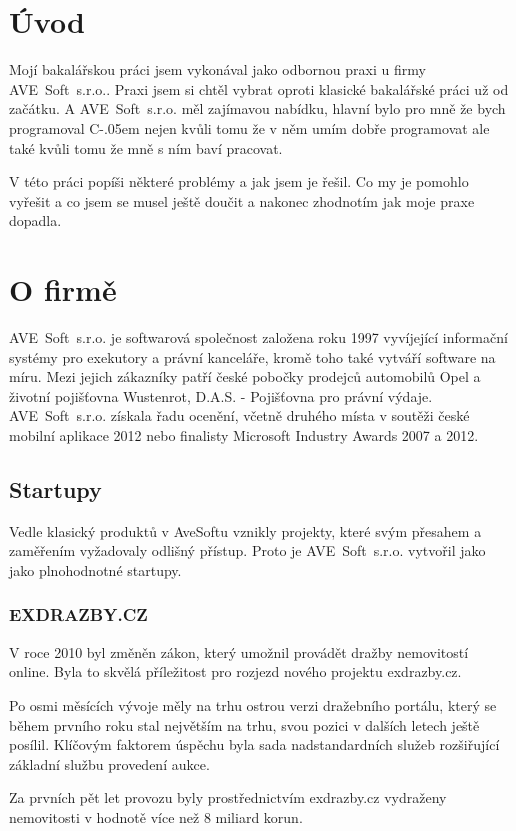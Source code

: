 \documentclass[czech,bachelor,dept460,male,csharp]{diploma}
\newcommand{\AveSoft}{AVE~Soft~s.r.o.}
\newcommand{\Csharp}{%
  {\settoheight{\dimen0}{C}C\kern-.05em \resizebox{!}{\dimen0}{\raisebox{\depth}{\#}}}}
\begin{document}
\MakeTitlePages

\section{Úvod}
Mojí bakalářskou práci jsem vykonával jako odbornou praxi u firmy \AveSoft. Praxi jsem si chtěl vybrat oproti klasické bakalářské práci už od začátku. A {\AveSoft} měl zajímavou nabídku, hlavní bylo pro mně že bych programoval {\Csharp} nejen kvůli tomu že v něm umím dobře programovat ale také kvůli tomu že mně s ním baví pracovat.

V této práci popíši některé problémy a jak jsem je řešil. Co my je pomohlo vyřešit a co jsem se musel ještě doučit a nakonec zhodnotím jak moje praxe dopadla.
\section{O firmě}
	\AveSoft\cite{avesoftL} je softwarová společnost založena roku 1997 vyvíjející informační systémy pro exekutory a právní kanceláře, kromě toho také vytváří software na míru.
	Mezi jejich zákazníky patří české pobočky prodejců automobilů Opel a životní pojišťovna Wustenrot, D.A.S. - Pojišťovna pro právní výdaje.
	\AveSoft\cite{avesoft} získala řadu ocenění, včetně druhého místa v soutěži české mobilní aplikace 2012 nebo finalisty Microsoft Industry Awards 2007 a 2012.
	\subsection{Startupy}
	Vedle klasický produktů v AveSoftu vznikly projekty, které svým přesahem a zaměřením vyžadovaly odlišný přístup. Proto je {\AveSoft} vytvořil jako jako plnohodnotné startupy.
 		\subsubsection{EXDRAZBY.CZ}
 		V roce 2010 byl změněn zákon, který umožnil provádět dražby nemovitostí online. Byla to skvělá příležitost pro rozjezd nového projektu exdrazby.cz.

		Po osmi měsících vývoje měly na trhu ostrou verzi dražebního portálu, který se během prvního roku stal největším na trhu, svou pozici v dalších letech ještě posílil. Klíčovým faktorem úspěchu byla sada nadstandardních služeb rozšiřující základní službu provedení aukce.

		Za prvních pět let provozu byly prostřednictvím exdrazby.cz vydraženy nemovitosti v hodnotě více než 8 miliard korun.
\end{document}
